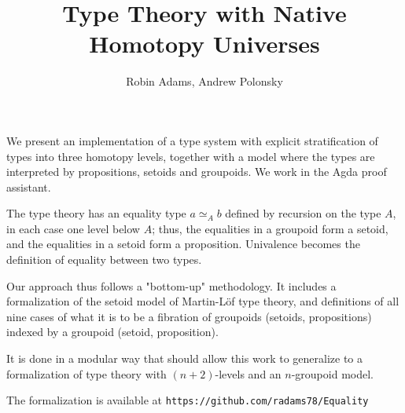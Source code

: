 \documentclass{article}
\title{Type Theory with Native Homotopy Universes}
\author{Robin Adams, Andrew Polonsky}
\date{}
\begin{document}
\maketitle

We present an implementation of a type system with explicit stratification of types into three homotopy levels, together with a model where the types are interpreted by propositions, setoids and groupoids.  We work in the Agda proof assistant.

The type theory has an equality type $a \simeq_A b$ defined by recursion on the type $A$, in each case one level below $A$; thus, the equalities in a groupoid form a setoid, and the equalities in a setoid form a proposition.  Univalence becomes the definition of equality between two types.

Our approach thus follows a "bottom-up" methodology.  It includes a formalization of the setoid model of Martin-L\"{o}f type theory, and definitions of all nine cases of what it is to be a fibration of groupoids (setoids, propositions) indexed by a groupoid (setoid, proposition).

It is done in a modular way that should allow this work to generalize to a formalization of type theory with $(n+2)$-levels and an $n$-groupoid model.

The formalization is available at \texttt{https://github.com/radams78/Equality}
\end{document}
